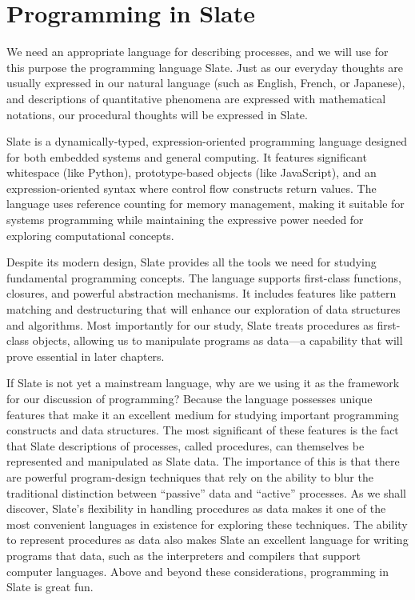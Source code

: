 \section*{Programming in Slate}

We need an appropriate language for describing processes, and we will use for this purpose the programming language Slate. Just as our everyday thoughts are usually expressed in our natural language (such as English, French, or Japanese), and descriptions of quantitative phenomena are expressed with mathematical notations, our procedural thoughts will be expressed in Slate.

Slate is a dynamically-typed, expression-oriented programming language designed for both embedded systems and general computing. It features significant whitespace (like Python), prototype-based objects (like JavaScript), and an expression-oriented syntax where control flow constructs return values. The language uses reference counting for memory management, making it suitable for systems programming while maintaining the expressive power needed for exploring computational concepts.

Despite its modern design, Slate provides all the tools we need for studying fundamental programming concepts. The language supports first-class functions, closures, and powerful abstraction mechanisms. It includes features like pattern matching and destructuring that will enhance our exploration of data structures and algorithms. Most importantly for our study, Slate treats procedures as first-class objects, allowing us to manipulate programs as data---a capability that will prove essential in later chapters.

If Slate is not yet a mainstream language, why are we using it as the framework for our discussion of programming? Because the language possesses unique features that make it an excellent medium for studying important programming constructs and data structures. The most significant of these features is the fact that Slate descriptions of processes, called procedures, can themselves be represented and manipulated as Slate data. The importance of this is that there are powerful program-design techniques that rely on the ability to blur the traditional distinction between ``passive'' data and ``active'' processes. As we shall discover, Slate's flexibility in handling procedures as data makes it one of the most convenient languages in existence for exploring these techniques. The ability to represent procedures as data also makes Slate an excellent language for writing programs that data, such as the interpreters and compilers that support computer languages. Above and beyond these considerations, programming in Slate is great fun.